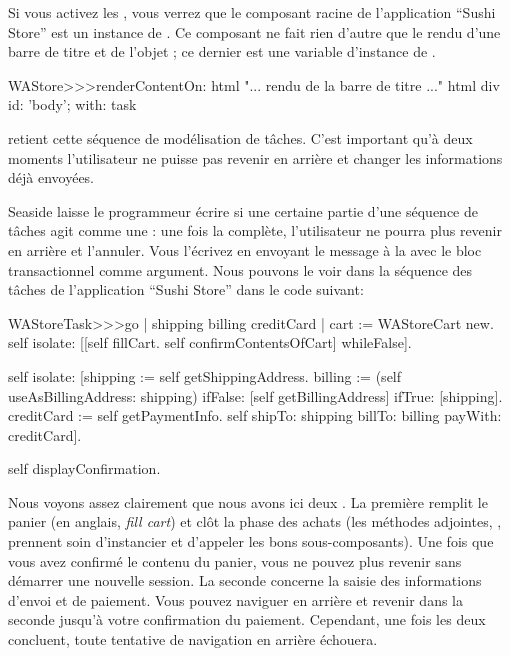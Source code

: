 \documentclass[a4paper,10pt,twoside]{book}
\begin{document}
Si vous activez les , vous verrez que le
composant racine de l'application ``Sushi Store'' est un instance de
.
Ce composant ne fait rien d'autre que le rendu d'une barre de titre et
de l'objet ; ce dernier est une variable d'instance de
.

\begin{code}{}
WAStore>>>renderContentOn: html
	"... rendu de la barre de titre ..."
	html div id: 'body'; with: task
\end{code}

 retient cette séquence de modélisation de tâches.
C'est important qu'à deux moments l'utilisateur ne puisse pas revenir
en arrière et changer les informations déjà envoyées.


Seaside laisse le programmeur écrire si une certaine partie d'une
séquence de tâches agit comme une \transaction: une fois la
\transaction complète, l'utilisateur ne pourra plus revenir en arrière
et l'annuler.
Vous l'écrivez en envoyant le message  à
la \task avec le bloc transactionnel comme argument.
Nous pouvons le voir dans la séquence des tâches de l'application
``Sushi Store'' dans le code suivant:

\begin{code}{}
WAStoreTask>>>go
	| shipping billing creditCard |
	cart := WAStoreCart new.
	self isolate:
		[[self fillCart.
		self confirmContentsOfCart]
			whileFalse].

	self isolate:
		[shipping := self getShippingAddress.
		billing := (self useAsBillingAddress: shipping)
					ifFalse: [self getBillingAddress]
					ifTrue: [shipping].
		creditCard := self getPaymentInfo.
		self shipTo: shipping billTo: billing payWith: creditCard].

	self displayConfirmation.
\end{code}

Nous voyons assez clairement que nous avons ici deux \transactions.
La première remplit le panier (en anglais, \emph{fill cart}) et clôt
la phase des achats (les méthodes adjointes,  \etc,
prennent soin d'instancier et d'appeler les bons sous-composants).
Une fois que vous avez confirmé le contenu du panier, vous ne pouvez
plus revenir sans démarrer une nouvelle session.
La seconde \transaction concerne la saisie des informations d'envoi et
de paiement.
Vous pouvez naviguer en arrière et revenir dans la seconde
\transaction{} jusqu'à votre confirmation du paiement.
Cependant, une fois les deux \transactions{} concluent, toute tentative
de navigation en arrière échouera.
\end{document}
